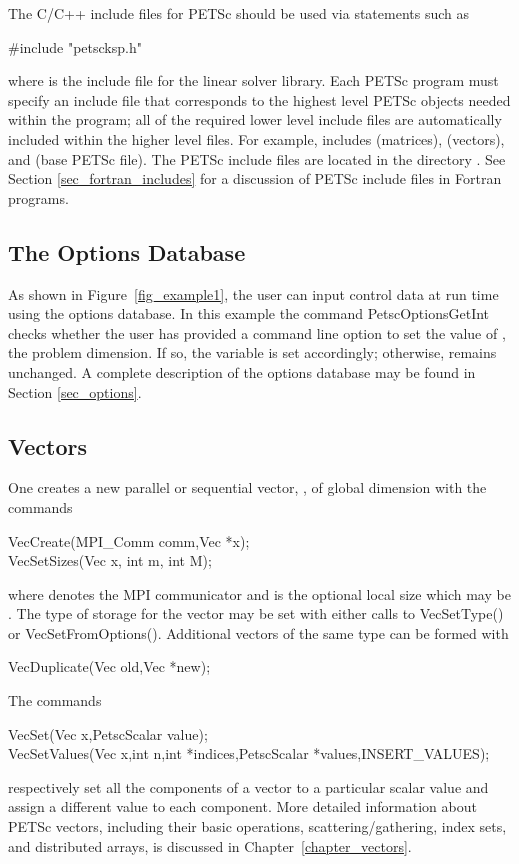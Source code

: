 The C/C++ include files for PETSc should be used via statements such as
\begin{tabbing}
{\footnotesize
   \#include "petscksp.h"
}
\end{tabbing}
where  is the include file for the linear solver library.
Each PETSc program must specify an
include file that corresponds to the highest level PETSc objects
needed within the program; all of the required lower level include
files are automatically included within the higher level files.  For
example,  includes  (matrices),
 (vectors), and  (base PETSc file).  
The PETSc include files are located in the directory 
.  See Section \ref{sec_fortran_includes}
for a discussion of PETSc include files in Fortran programs.

\subsection*{The Options Database}

As shown in Figure~\ref{fig_example1}, the user can input control data
at run time using the options database. In this example the command
PetscOptionsGetInt checks whether the user has
provided a command line option to set the value of , the
problem dimension.  If so, the variable  is set accordingly;
otherwise,  remains unchanged. A complete description of the
options database may be found in Section \ref{sec_options}.

\subsection*{Vectors}
\label{sec_vecintro}

One creates a new parallel or 
sequential vector, , of global dimension  with the 
commands  
\begin{tabbing}
  VecCreate(MPI\_Comm comm,Vec *x);\\
  VecSetSizes(Vec x, int m, int M);
\end{tabbing}
where  denotes the MPI communicator and  is the optional local size
which may be . The type of storage
for the vector may be set with either calls to 
VecSetType() or VecSetFromOptions().
Additional vectors of the same type can be formed with
\begin{tabbing}
  VecDuplicate(Vec old,Vec *new);
\end{tabbing}
The commands 
\begin{tabbing}
  VecSet(Vec x,PetscScalar value);\\
  VecSetValues(Vec x,int n,int *indices,PetscScalar *values,INSERT\_VALUES);
\end{tabbing}
respectively set all the components of a vector to a particular scalar
value and assign a different value to each component.  More
detailed information about PETSc vectors, including their basic
operations, scattering/gathering, index sets, and distributed arrays, is
discussed in Chapter~\ref{chapter_vectors}.

